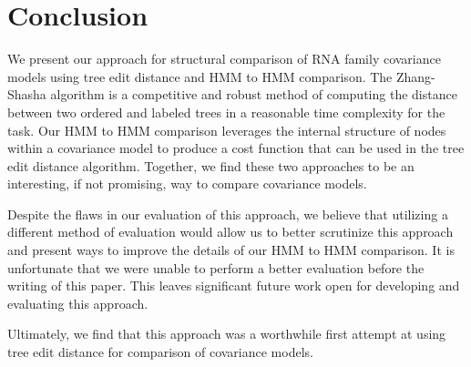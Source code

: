 \section{Conclusion}
\label{sec:conlusion}

We present our approach for structural comparison of RNA family covariance models using tree edit distance and HMM to HMM comparison.
The Zhang-Shasha algorithm is a competitive and robust method of computing the distance between two ordered and labeled trees in a reasonable time complexity for the task.
Our HMM to HMM comparison leverages the internal structure of nodes within a covariance model to produce a cost function that can be used in the tree edit distance algorithm.
Together, we find these two approaches to be an interesting, if not promising, way to compare covariance models.

Despite the flaws in our evaluation of this approach, we believe that utilizing a different method of evaluation would allow us to better scrutinize this approach and present ways to improve the details of our HMM to HMM comparison.
It is unfortunate that we were unable to perform a better evaluation before the writing of this paper.
This leaves significant future work open for developing and evaluating this approach.

Ultimately, we find that this approach was a worthwhile first attempt at using tree edit distance for comparison of covariance models.
